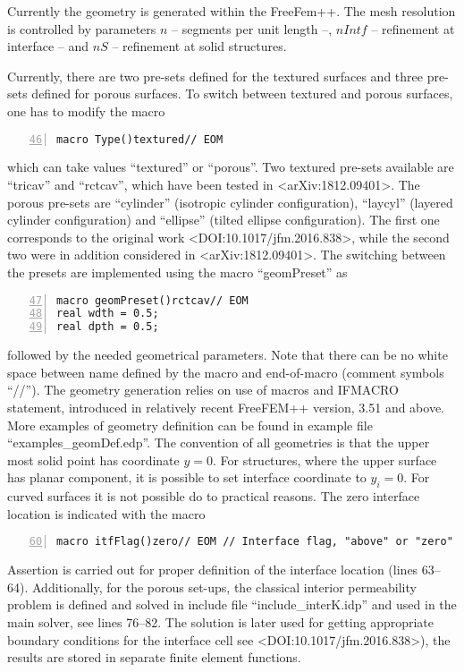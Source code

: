 \documentclass[12pt,a4paper]{article}
\begin{document}
Currently the geometry is generated within the FreeFem++. The mesh resolution is
controlled by parameters $n$ -- segments per unit length --, $nIntf$ -- 
refinement at interface -- and $nS$ -- refinement at solid structures.

Currently, there are two pre-sets defined for the textured surfaces and three pre-sets
defined for porous surfaces. To switch between textured and porous surfaces, one has to
modify the macro
\begin{lstlisting}[numbers=left,firstnumber=46]
macro Type()textured// EOM                                                                    
\end{lstlisting}
which can take values ``textured'' or ``porous''.
Two textured pre-sets available are ``tricav'' and ``rctcav'', which have been
tested in  <arXiv:1812.09401>. The porous pre-sets are
``cylinder'' (isotropic cylinder
configuration), ``laycyl'' (layered cylinder configuration) and ``ellipse'' (tilted ellipse configuration).
The first one corresponds to the original work <DOI:10.1017/jfm.2016.838>, while the second two were
in addition considered in <arXiv:1812.09401>. The switching between the presets
are implemented using the macro ``geomPreset'' as
\begin{lstlisting}[numbers=left,firstnumber=47]
macro geomPreset()rctcav// EOM                                                                
real wdth = 0.5;
real dpth = 0.5;
\end{lstlisting}
followed by the needed geometrical parameters.
Note that there can be no white space between name defined by the macro and end-of-macro (comment symbols
``//''). The geometry generation relies on use of macros and IFMACRO statement, introduced in relatively
recent FreeFEM++ version, 3.51 and above. More examples of geometry definition can be found in
example file ``examples\_geomDef.edp''. The convention of all geometries is that the upper most solid
point has coordinate $y = 0$. For structures, where the upper surface has planar component, it is possible
to set interface coordinate to $y_i = 0$. For curved surfaces it is not possible do to practical reasons.
The zero interface location is indicated with the macro
\begin{lstlisting}[numbers=left,firstnumber=60]
macro itfFlag()zero// EOM // Interface flag, "above" or "zero"                                
\end{lstlisting}
Assertion is carried out for proper definition of the interface location (lines 63--64).
Additionally, for the porous set-ups, the classical interior permeability problem 
is defined and solved in include file ``include\_interK.idp'' and
used in the main solver, see lines 76--82.
The solution is later used for
getting appropriate boundary conditions for the interface cell 
see <DOI:10.1017/jfm.2016.838>), the results are stored in
separate finite element functions.
\end{document}
